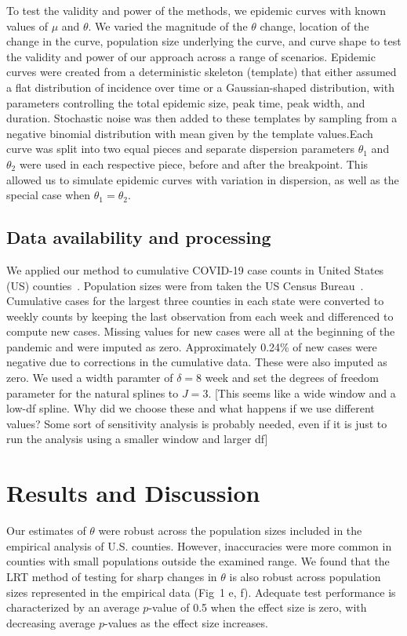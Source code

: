 \documentclass[11pt,letterpaper]{article}
\begin{document}
To test the validity and power of the methods, we epidemic curves with known values of $\mu$ and $\theta$.
We varied the magnitude of the $\theta$ change, location of the change in the curve, population size underlying the curve, and curve shape to test the validity and power of our approach across a range of scenarios.
Epidemic curves were created from a deterministic skeleton (template) that either assumed a flat distribution of incidence over time or a Gaussian-shaped distribution, with parameters controlling the total epidemic size, peak time, peak width, and duration. 
Stochastic noise was then added to these templates by sampling from a negative binomial distribution with mean given by the template values.Each curve was split into two equal pieces and separate dispersion parameters $\theta_1$ and $\theta_2$ were used in each respective piece, before and after the breakpoint. 
This allowed us to simulate epidemic curves with variation in dispersion, as well as the special case when $\theta_1 = \theta_2$.

\subsection*{Data availability and processing}
We applied our method to cumulative COVID-19 case counts in United States (US) counties~\citep{nytimes_covid19}.
Population sizes were from taken the US Census Bureau~\citep{us_census_county_population_2021}.
Cumulative cases for the largest three counties in each state were converted to weekly counts by keeping the last observation from each week and differenced to compute new cases. Missing values for new cases were all at the beginning of the pandemic and were imputed as zero. 
Approximately 0.24\% of new cases were negative due to corrections in the cumulative data. These were also imputed as zero. 
We used a width paramter of $\delta = 8$ week and set the degrees of freedom parameter for the natural splines to $J = 3$.  
[This seems like a wide window and a low-df spline. Why did we choose these and what happens if we use different values? Some sort of sensitivity analysis is probably needed, even if it is just to run the analysis using a smaller window and larger df]

\section*{Results and Discussion}
Our estimates of $\theta$ were robust across the population sizes included in the empirical analysis of U.S. counties. 
However, inaccuracies were more common in counties with small populations outside the examined range.%
We found that the LRT method of testing for sharp changes in $\theta$ is also robust across population sizes represented in the empirical data (Fig\ 1 e, f). 
Adequate test performance is characterized by an average \( p \)-value of 0.5 when the effect size is zero, with decreasing average $p$-values as the effect size increases. 
\end{document}
